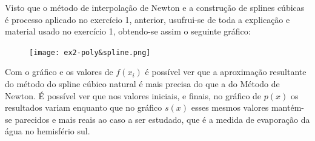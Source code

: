 \documentclass[12pt, letterpaper,fleqn]{article}
\begin{document}
Visto que o método de interpolação de Newton e a construção de splines cúbicas é processo aplicado no exercício 1, anterior, usufrui-se de toda a explicação e material usado no exercício 1, obtendo-se assim o seguinte gráfico:

\begin{figure}[H]
    \centering
    \texttt{[image: ex2-poly\&spline.png]}
    \label{fig:my_label}
\end{figure}
Com o gráfico e os valores de $f(x_i)$ é possível ver que a aproximação resultante do método do spline cúbico natural é mais precisa do que a do Método de Newton. É possível ver que nos valores iniciais, e finais, no gráfico de $p(x)$ os resultados variam enquanto que no gráfico $s(x)$ esses mesmos valores mantém-se parecidos e mais reais ao caso a ser estudado, que é a medida de evaporação da água no hemisfério sul.
\end{document}
